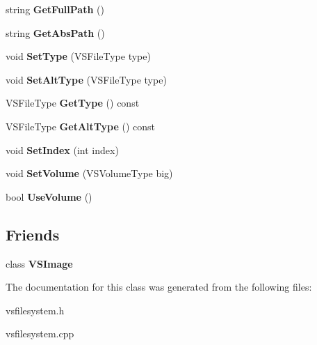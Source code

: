 \begin{DoxyCompactItemize}
\item 
string {\bfseries Get\+Full\+Path} ()\hypertarget{classVSFileSystem_1_1VSFile_a5bcf84aa6ada2f9214517656616ce6c6}{}\label{classVSFileSystem_1_1VSFile_a5bcf84aa6ada2f9214517656616ce6c6}

\item 
string {\bfseries Get\+Abs\+Path} ()\hypertarget{classVSFileSystem_1_1VSFile_a77a1038028d202ecba0677a31c6529b6}{}\label{classVSFileSystem_1_1VSFile_a77a1038028d202ecba0677a31c6529b6}

\item 
void {\bfseries Set\+Type} (V\+S\+File\+Type type)\hypertarget{classVSFileSystem_1_1VSFile_a680ce2bf9a5d862a2ed599d698eb9c8e}{}\label{classVSFileSystem_1_1VSFile_a680ce2bf9a5d862a2ed599d698eb9c8e}

\item 
void {\bfseries Set\+Alt\+Type} (V\+S\+File\+Type type)\hypertarget{classVSFileSystem_1_1VSFile_aeae4ffae72a9c68e5bec8de8c8cb5175}{}\label{classVSFileSystem_1_1VSFile_aeae4ffae72a9c68e5bec8de8c8cb5175}

\item 
V\+S\+File\+Type {\bfseries Get\+Type} () const \hypertarget{classVSFileSystem_1_1VSFile_ab6d492d8371120f84bb358ca393550a4}{}\label{classVSFileSystem_1_1VSFile_ab6d492d8371120f84bb358ca393550a4}

\item 
V\+S\+File\+Type {\bfseries Get\+Alt\+Type} () const \hypertarget{classVSFileSystem_1_1VSFile_a1354aae4125c478a49e75e0c6ef5c1e5}{}\label{classVSFileSystem_1_1VSFile_a1354aae4125c478a49e75e0c6ef5c1e5}

\item 
void {\bfseries Set\+Index} (int index)\hypertarget{classVSFileSystem_1_1VSFile_a92ac0d28f67e08dabc430de0ea01c032}{}\label{classVSFileSystem_1_1VSFile_a92ac0d28f67e08dabc430de0ea01c032}

\item 
void {\bfseries Set\+Volume} (V\+S\+Volume\+Type big)\hypertarget{classVSFileSystem_1_1VSFile_a3d306385cf9c43f8b7b914b53fd32be0}{}\label{classVSFileSystem_1_1VSFile_a3d306385cf9c43f8b7b914b53fd32be0}

\item 
bool {\bfseries Use\+Volume} ()\hypertarget{classVSFileSystem_1_1VSFile_a4f6b8d05a473fc2a54e404a026b5f3c9}{}\label{classVSFileSystem_1_1VSFile_a4f6b8d05a473fc2a54e404a026b5f3c9}

\end{DoxyCompactItemize}
\subsection*{Friends}
\begin{DoxyCompactItemize}
\item 
class {\bfseries V\+S\+Image}\hypertarget{classVSFileSystem_1_1VSFile_a173ea2f344e61da5cca35822ad21c5aa}{}\label{classVSFileSystem_1_1VSFile_a173ea2f344e61da5cca35822ad21c5aa}

\end{DoxyCompactItemize}


The documentation for this class was generated from the following files\+:\begin{DoxyCompactItemize}
\item 
vsfilesystem.\+h\item 
vsfilesystem.\+cpp\end{DoxyCompactItemize}
